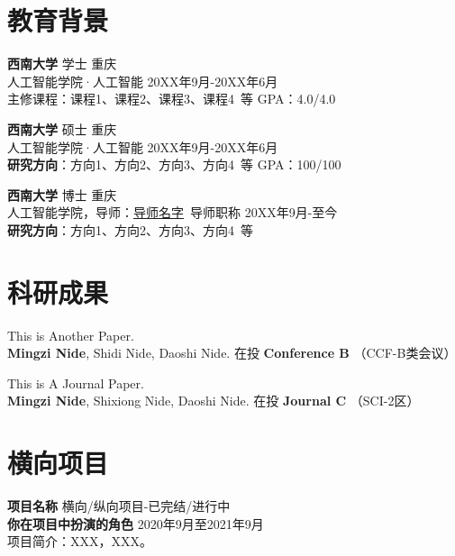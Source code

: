     \section{\makebox[\widthof{\faGraduationCap}][c]{\color{SWU_Blue}{\faGraduationCap}}\quad 教育背景}

    {\large \textbf{西南大学}}  学士 \hfill {重庆} \\
    {{人工智能学院}}·人工智能 \hfill {20XX年9月-20XX年6月} \\
    {主修课程}：课程1、课程2、课程3、课程4\ 等
    \hfill {GPA}：4.0/4.0

    \vspace{0.5em}
    {\large \textbf{西南大学}}  硕士 \hfill {重庆} \\
    {{人工智能学院}}·人工智能 \hfill {20XX年9月-20XX年6月} \\
    \textbf{研究方向}：方向1、方向2、方向3、方向4\ 等
    \hfill {GPA}：100/100

    \vspace{0.5em}
    {\large \textbf{西南大学}}  博士 \hfill {重庆} \\
    {{人工智能学院}}，导师：\href{导师的个人主页.site}{导师名字}\ 导师职称 \hfill {20XX年9月-至今} \\
    \textbf{研究方向}：方向1、方向2、方向3、方向4\ 等


    \section{\makebox[\widthof{\faGraduationCap}][c]{\color{SWU_Blue}{\faFlask}}\quad 科研成果}
    
    \vspace{0.5em}
    This is Another Paper. \\
    \textbf{Mingzi Nide}, Shidi Nide, Daoshi Nide. \hfill 
    在投 \textbf{Conference B} （CCF-B类会议）

    \vspace{0.5em}
    This is A Journal Paper.\\
    \textbf{Mingzi Nide}, Shixiong Nide, Daoshi Nide. \hfill 
    在投 \textbf{Journal C} （SCI-2区）


    \section{\makebox[\widthof{\faChalkboardTeacher}][c]{\color{SWU_Blue}{\faChalkboardTeacher}}\quad 横向项目}
    \vspace{0.5em}
    {\large{\textbf{项目名称}}} \hfill {横向/纵向项目-已完结/进行中}\\
    \textbf{你在项目中扮演的角色} \hfill 2020年9月至2021年9月\\
    项目简介：XXX，XXX。
    
